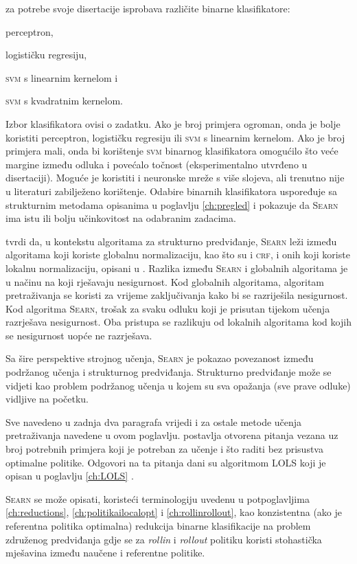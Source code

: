 \citeauthor{daume06thesis} za potrebe svoje disertacije isprobava različite
binarne klasifikatore:
\begin{inlinelist}
  \item perceptron,
  \item logističku regresiju,
  \item \textsc{svm} s linearnim kernelom i
  \item \textsc{svm} s kvadratnim kernelom.
\end{inlinelist}
Izbor klasifikatora ovisi o zadatku. Ako je broj primjera ogroman, onda je bolje
koristiti perceptron, logističku regresiju ili \textsc{svm} s linearnim
kernelom. Ako je broj primjera mali, onda bi korištenje \textsc{svm} binarnog
klasifikatora omogućilo što veće margine između odluka i povećalo točnost
(eksperimentalno utvrđeno u disertaciji). Moguće je koristiti i neuronske mreže
s više slojeva, ali trenutno nije u literaturi zabilježeno korištenje. Odabire
binarnih klasifikatora \citeauthor{daume06thesis} uspoređuje sa strukturnim
metodama opisanima u poglavlju \ref{ch:pregled} i pokazuje da \textsc{Searn} ima
istu ili bolju učinkovitost na odabranim zadacima.

\citeauthor{daume06thesis} tvrdi da, u kontekstu algoritama za strukturno
predviđanje, \textsc{Searn} leži između algoritama koji koriste globalnu
normalizaciju, kao što su \mmmm{} i \textsc{crf}, i onih koji koriste lokalnu
normalizaciju, opisani u \citep{punyakanok2001use}. Razlika između
\textsc{Searn} i globalnih algoritama je u načinu na koji rješavaju nesigurnost.
Kod globalnih algoritama, algoritam pretraživanja se koristi za vrijeme
zaključivanja kako bi se razriješila nesigurnost. Kod algoritma \textsc{Searn},
trošak za svaku odluku koji je prisutan tijekom učenja razrješava nesigurnost.
Oba pristupa se razlikuju od lokalnih algoritama kod kojih se nesigurnost uopće
ne razrješava.

Sa šire perspektive strojnog učenja, \textsc{Searn} je pokazao povezanost između
podržanog učenja i strukturnog predviđanja. Strukturno predviđanje može se
vidjeti kao problem podržanog učenja u kojem su sva opažanja (sve prave odluke)
vidljive na početku.

Sve navedeno u zadnja dva paragrafa vrijedi i za ostale metode učenja
pretraživanja navedene u ovom poglavlju. \citeauthor{daume06thesis} postavlja
otvorena pitanja vezana uz broj potrebnih primjera koji je potreban za učenje i
što raditi bez prisustva optimalne politike. Odgovori na ta pitanja dani su
algoritmom \textsc{LOLS} koji je opisan u poglavlju \ref{ch:LOLS}
\citep{daume15lols}.

\textsc{Searn} se može opisati, koristeći terminologiju uvedenu u potpoglavljima
\ref{ch:reductions}, \ref{ch:politikailocalopt} i \ref{ch:rollinrollout}, kao
konzistentna (ako je referentna politika optimalna) redukcija binarne
klasifikacije na problem združenog predviđanja gdje se za \textit{rollin} i
\textit{rollout} politiku koristi stohastička mješavina između naučene i
referentne politike.
